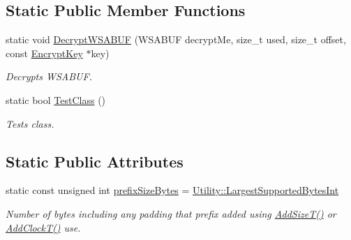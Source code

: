 \subsection*{Static Public Member Functions}
\begin{DoxyCompactItemize}
\item 
static void \hyperlink{class_packet_a20fdfbf92489c69fbebaf937c59a9be4}{DecryptWSABUF} (WSABUF decryptMe, size\_\-t used, size\_\-t offset, const \hyperlink{class_encrypt_key}{EncryptKey} $\ast$key)
\begin{DoxyCompactList}\small\item\em Decrypts WSABUF. \item\end{DoxyCompactList}\item 
static bool \hyperlink{class_packet_a60f8b04e48b7ae57289bb009d74e97a2}{TestClass} ()
\begin{DoxyCompactList}\small\item\em Tests class. \item\end{DoxyCompactList}\end{DoxyCompactItemize}
\subsection*{Static Public Attributes}
\begin{DoxyCompactItemize}
\item 
static const unsigned int \hyperlink{class_packet_a42ceeb49399f078bf848896bef2fa529}{prefixSizeBytes} = \hyperlink{namespace_utility_a1a17222360aeac0c7e8b5a9b3b13cc58}{Utility::LargestSupportedBytesInt}
\begin{DoxyCompactList}\small\item\em Number of bytes including any padding that prefix added using \hyperlink{class_packet_a35b1fc5b107629dfc63dd0d9382cfb03}{AddSizeT()} or \hyperlink{class_packet_a60b85220c73a9474bfe17cb0e5d00771}{AddClockT()} use. \item\end{DoxyCompactList}\end{DoxyCompactItemize}
